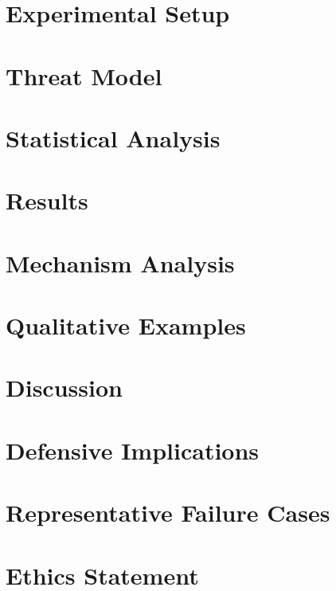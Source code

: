 \documentclass[11pt]{article}
\begin{document}
\section{Experimental Setup}


\section{Threat Model}


\section{Statistical Analysis}


\section{Results}


\section{Mechanism Analysis}


\section{Qualitative Examples}


\section{Discussion}


\section{Defensive Implications}


\section{Representative Failure Cases}


\section{Ethics Statement}

\end{document}
